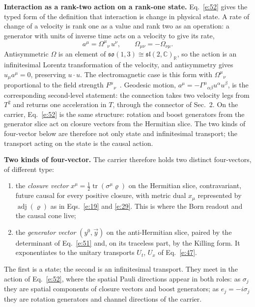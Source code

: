 \documentclass[10pt]{article}
\newcommand{\tr}{\operatorname{tr}}
\newcommand{\adj}{\operatorname{adj}}
\begin{document}
\smallskip
\noindent\textbf{Interaction as a rank-two action on a rank-one state.} Eq.~\eqref{e:52} gives the typed form of the definition that interaction is change in physical state. A rate of change of a velocity is rank one as a value and rank two as an operation: a generator with units of inverse time acts on a velocity to give its rate,
\begin{equation*}
a^\mu=\Omega^\mu{}_\nu\,u^\nu,\qquad \Omega_{\mu\nu}=-\Omega_{\nu\mu}.
\end{equation*}
Antisymmetric $\Omega$ is an element of $\mathfrak{so}(1,3)\cong\mathfrak{sl}(2,\mathbb C)_{\mathbb R}$, so the action is an infinitesimal Lorentz transformation of the velocity, and antisymmetry gives $u_\mu a^\mu=0$, preserving $u\cdot u$. The electromagnetic case is this form with $\Omega^\mu{}_\nu$ proportional to the field strength $F^\mu{}_\nu$~\cite{jackson}. Geodesic motion, $a^\mu=-\Gamma^\mu{}_{\alpha\beta}u^\alpha u^\beta$, is the corresponding second-level statement: the connection takes two velocity legs from $T^2$ and returns one acceleration in $T$, through the connector of Sec.~2. On the carrier, Eq.~\eqref{e:52} is the same structure: rotation and boost generators from the generator slice act on closure vectors from the Hermitian slice. The two kinds of four-vector below are therefore not only state and infinitesimal transport; the transport acting on the state is the causal action.

\smallskip
\noindent\textbf{Two kinds of four-vector.} The carrier therefore holds two distinct four-vectors, of different type:
\begin{enumerate}\itemsep0pt
\item the \emph{closure vector} $x^\mu=\frac12\tr(\sigma^\mu\varrho)$ on the Hermitian slice, contravariant, future causal for every positive closure, with metric dual $x_\mu$ represented by $\adj(\varrho)$ as in Eqs.~\eqref{e:19} and \eqref{e:29}. This is where the Born readout and the causal cone live;
\item the \emph{generator vector} $(y^0,\vec y)$ on the anti-Hermitian slice, paired by the determinant of Eq.~\eqref{e:51} and, on its traceless part, by the Killing form. It exponentiates to the unitary transports $U_t$, $U_x$ of Eq.~\eqref{e:47}.
\end{enumerate}
The first is a state; the second is an infinitesimal transport. They meet in the action of Eq.~\eqref{e:52}, where the spatial Pauli directions appear in both roles: as $\sigma_j$ they are spatial components of closure vectors and boost generators; as $e_j=-i\sigma_j$ they are rotation generators and channel directions of the carrier.
\end{document}

